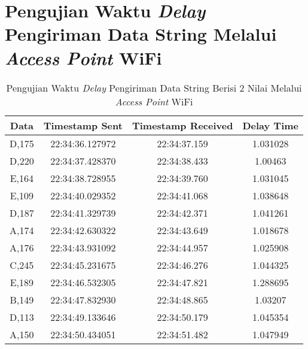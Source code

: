 \section{Pengujian Waktu \emph{Delay} Pengiriman Data String Melalui \emph{Access Point} WiFi}
\label{sec:delayWiFi}

\begin{longtable}{|ccc|c|}
  \caption{Pengujian Waktu \emph{Delay} Pengiriman Data String Berisi 2 Nilai Melalui \emph{Access Point} WiFi}
  \label{tbl:delayWiFi2}\\
    \hline
    \multicolumn{1}{|c|}{Data}  & \multicolumn{1}{c|}{Timestamp Sent}  & Timestamp Received & Delay Time  \\ \hline
    \endfirsthead
    \endhead
    \multicolumn{1}{|c|}{D,175} & \multicolumn{1}{c|}{22:34:36.127972} & 22:34:37.159       & 1.031028    \\ \hline
    \multicolumn{1}{|c|}{D,220} & \multicolumn{1}{c|}{22:34:37.428370} & 22:34:38.433       & 1.00463     \\ \hline
    \multicolumn{1}{|c|}{E,164} & \multicolumn{1}{c|}{22:34:38.728955} & 22:34:39.760       & 1.031045    \\ \hline
    \multicolumn{1}{|c|}{E,109} & \multicolumn{1}{c|}{22:34:40.029352} & 22:34:41.068       & 1.038648    \\ \hline
    \multicolumn{1}{|c|}{D,187} & \multicolumn{1}{c|}{22:34:41.329739} & 22:34:42.371       & 1.041261    \\ \hline
    \multicolumn{1}{|c|}{A,174} & \multicolumn{1}{c|}{22:34:42.630322} & 22:34:43.649       & 1.018678    \\ \hline
    \multicolumn{1}{|c|}{A,176} & \multicolumn{1}{c|}{22:34:43.931092} & 22:34:44.957       & 1.025908    \\ \hline
    \multicolumn{1}{|c|}{C,245} & \multicolumn{1}{c|}{22:34:45.231675} & 22:34:46.276       & 1.044325    \\ \hline
    \multicolumn{1}{|c|}{E,189} & \multicolumn{1}{c|}{22:34:46.532305} & 22:34:47.821       & 1.288695    \\ \hline
    \multicolumn{1}{|c|}{B,149} & \multicolumn{1}{c|}{22:34:47.832930} & 22:34:48.865       & 1.03207     \\ \hline
    \multicolumn{1}{|c|}{D,113} & \multicolumn{1}{c|}{22:34:49.133646} & 22:34:50.179       & 1.045354    \\ \hline
    \multicolumn{1}{|c|}{A,150} & \multicolumn{1}{c|}{22:34:50.434051} & 22:34:51.482       & 1.047949    \\ \hline

\end{longtable}
